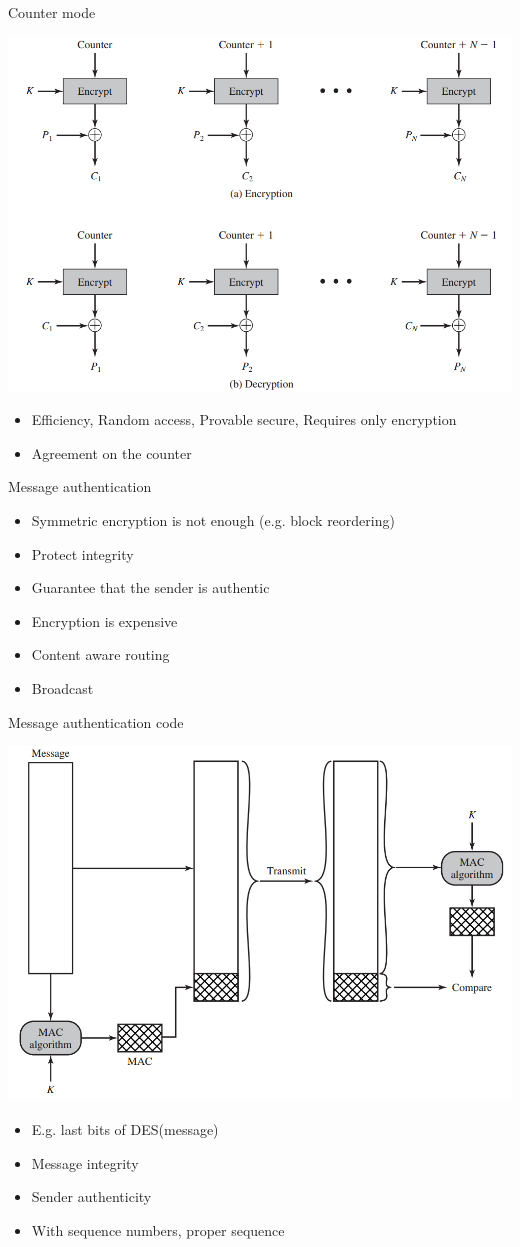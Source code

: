 \documentclass{beamer}
\begin{document}
\begin{frame}[t]{Counter mode}
  \begin{center}
    \includegraphics[width=0.7\linewidth]{CTR}
  \end{center}
  \begin{itemize}
  \item<2-> Efficiency, Random access, Provable secure, Requires only
    encryption
  \item<3-> Agreement on the counter
  \end{itemize}
\end{frame}

\begin{frame}{Message authentication}
  \begin{itemize}
\item Symmetric encryption is not enough (e.g. block reordering)
\item Protect integrity
\item Guarantee that the sender is authentic
\item Encryption is expensive
\item Content aware routing
\item Broadcast
  \end{itemize}
\end{frame}

\begin{frame}{Message authentication code}
  \begin{center}
    \includegraphics[width=0.6\linewidth]{MAC}
  \end{center}
  \begin{itemize}
\item E.g. last bits of DES(message)
\item Message integrity
\item Sender authenticity
\item With sequence numbers, proper sequence
  \end{itemize}
\end{frame}
\end{document}
